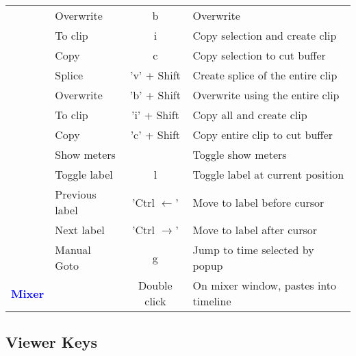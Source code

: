 \begin{center}
\begin{longtable}{ >{\bfseries}c l c p{6cm}}
        & Overwrite & b & Overwrite \\        
        & To clip & i & Copy selection and create clip \\        
        & Copy & c & Copy selection to cut buffer \\        
        & Splice & 'v' + Shift & Create splice of the entire clip \\        
        & Overwrite & 'b' + Shift & Overwrite using the entire clip \\        
        & To clip & 'i' + Shift & Copy all and create clip \\        
        & Copy & 'c' + Shift & Copy entire clip to cut buffer \\        
        & Show meters &  & Toggle show meters \\        
        & Toggle label & l & Toggle label at current position \\        
        & Previous label & 'Ctrl $\leftarrow$' & Move to label before cursor \\        
        & Next label & 'Ctrl $\rightarrow$' & Move to label after cursor \\        
        & Manual Goto & g & Jump to time selected by popup \\
        \midrule
        \textcolor{blue}{Mixer} &  & Double click & On mixer window, pastes into timeline\\        
        
        \bottomrule  
    \end{longtable}
\end{center}      

\subsection{Viewer Keys }%
\label{ssec:viewer_keys}

